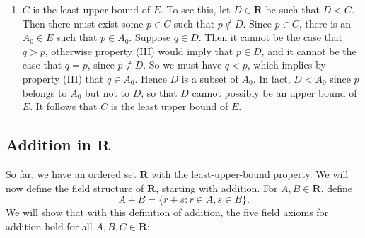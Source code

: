 \documentclass[12pt]{article}
\newcommand{\R}{\mathbf{R}}
\theoremstyle{definition}
\begin{document}
\begin{enumerate}[label = (S\arabic*)]
    \item \( C \) is the least upper bound of \( E \). To see this, let \( D \in \R \) be such that \( D < C \). Then there must exist some \( p \in C \) such that \( p \not\in D \). Since \( p \in C \), there is an \( A_0 \in E \) such that \( p \in A_0 \). Suppose \( q \in D \). Then it cannot be the case that \( q > p \), otherwise property (III) would imply that \( p \in D \), and it cannot be the case that \( q = p \), since \( p \not\in D \). So we must have \( q < p \), which implies by property (III) that \( q \in A_0 \). Hence \( D \) is a subset of \( A_0 \). In fact, \( D < A_0 \) since \( p \) belongs to \( A_0 \) but not to \( D \), so that \( D \) cannot possibly be an upper bound of \( E \). It follows that \( C \) is the least upper bound of \( E \).
\end{enumerate}

\subsection{Addition in \texorpdfstring{\(\R\)}{}}
\label{sec:addition_in_R}

So far, we have an ordered set \( \R \) with the least-upper-bound property. We will now define the field structure of \( \R \), starting with addition. For \( A, B \in \R \), define
\[
    A + B = \{ r + s : r \in A, s \in B \}.
\]
We will show that with this definition of addition, the five field axioms for addition hold for all \( A, B, C \in \R \):
\end{document}
